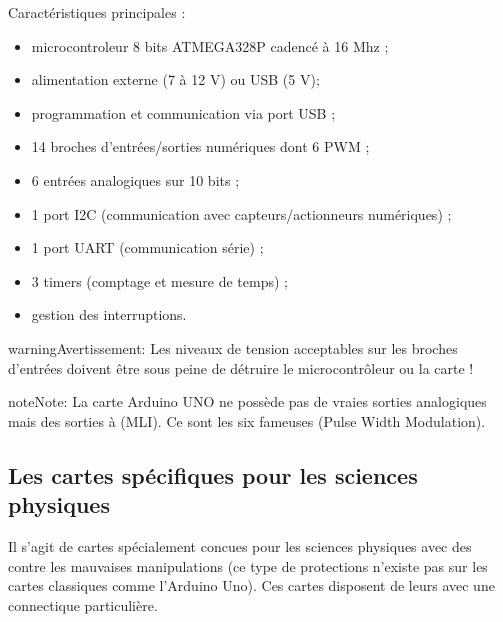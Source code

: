 \documentclass[a4paper,10pt,french]{book}
\let\sphinxpxdimen\pdfpxdimen\else\newdimen\sphinxpxdimen
\begin{document}
Caractéristiques principales :
\begin{itemize}
\item {} 
microcontroleur 8 bits ATMEGA328P cadencé à 16 Mhz ;

\item {} 
alimentation externe (7 à 12 V) ou USB (5 V);

\item {} 
programmation et communication via port USB ;

\item {} 
14 broches d’entrées/sorties numériques dont 6 PWM ;

\item {} 
6 entrées analogiques sur 10 bits ;

\item {} 
1 port I2C (communication avec capteurs/actionneurs numériques) ;

\item {} 
1 port UART (communication série) ;

\item {} 
3 timers (comptage et mesure de temps) ;

\item {} 
gestion des interruptions.

\end{itemize}

\noindent{\hspace*{\fill}\sphinxincludegraphics[width=336.00000\sphinxpxdimen,height=238.00000\sphinxpxdimen]{{arduino-uno_rev3_pixabay}.png}\hspace*{\fill}}

\begin{sphinxadmonition}{warning}{Avertissement:}
Les niveaux de tension acceptables sur les broches d’entrées doivent être  sous peine de détruire le microcontrôleur ou la carte !
\end{sphinxadmonition}

\begin{sphinxadmonition}{note}{Note:}
La carte Arduino UNO ne possède pas de vraies sorties analogiques mais des sorties à  (MLI). Ce sont les six fameuses  (Pulse Width Modulation).
\end{sphinxadmonition}


\subsection{Les cartes spécifiques pour les sciences physiques}
\label{\detokenize{2_arduino/2_cartes_arduino:les-cartes-specifiques-pour-les-sciences-physiques}}
Il s’agit de cartes spécialement concues pour les sciences physiques avec des  contre les mauvaises manipulations (ce type de protections n’existe pas sur les cartes classiques comme l’Arduino Uno). Ces cartes disposent de leurs  avec une connectique particulière.
\end{document}
